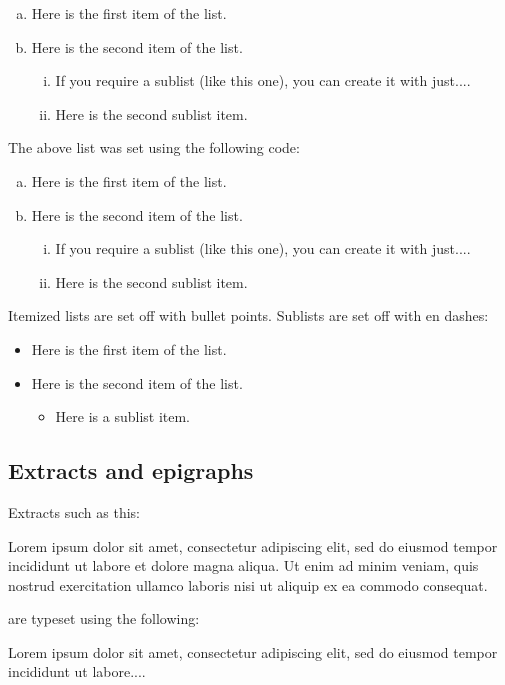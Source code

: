 \documentclass{cje}          %
\theoremstyle{plain}%
\theoremstyle{definition}
\theoremstyle{remark}
\begin{document}
\begin{enumerate}[(b)]
\usealpha
\item Here is the first item of the list.
\item Here is the second item of the list.
  \begin{enumerate}[(ii)]
  \useroman
    \item If you require a sublist (like this one), you can create it with just.... 
    \item Here is the second sublist item.
  \end{enumerate}
\end{enumerate}
The above list was set using the following code:
\begin{smallverbatim}
\begin{enumerate}[(b)]
\usealpha
  \item Here is the first item of the list.
  \item Here is the second item of the list.
    \begin{enumerate}[(ii)]
    \useroman
      \item If you require a sublist (like this one), you can create it
      with just.... 
      \item Here is the second sublist item.
    \end{enumerate}
\end{enumerate}
\end{smallverbatim}

Itemized lists are set off with bullet points. Sublists are set off with en dashes:
\begin{itemize}
\item Here is the first item of the list.
  \item Here is the second item of the list.
  \begin{itemize}
  \item Here is a sublist item.
  \end{itemize}
\end{itemize}


\subsection{Extracts and epigraphs}
Extracts such as this:
\begin{extract}
Lorem ipsum dolor sit amet, consectetur adipiscing elit, sed do eiusmod tempor incididunt ut labore et dolore magna aliqua. Ut enim ad minim veniam, quis nostrud exercitation ullamco laboris nisi ut aliquip ex ea commodo consequat. 
\end{extract}
are typeset using the following:
\begin{smallverbatim}
\begin{extract}
Lorem ipsum dolor sit amet, consectetur adipiscing elit, sed do eiusmod
tempor incididunt ut labore.... 
\end{extract}
\end{smallverbatim}
\end{document}
